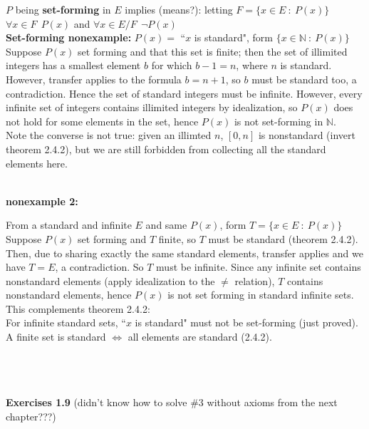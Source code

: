 \documentclass{article}
\newcommand{\hsp}[1][5]{\hspace{0.#1 cm}}
\newcommand{\hcm}[1][1]{\hspace{#1 cm}}
\newcommand{\st}{\ : \ }
\newcommand{\N}{\mathbb{N}}
\begin{document}
\begin{flushleft}
$P$ being \textbf{set-forming} in $E$ implies (means?): letting $F = \{x \in E \st P(x)\}$\\\hcm\hsp $\forall x \in F\ \ P(x)$ and $\forall x \in E/F\ \ \neg P(x)$\\[6pt] 
\textbf{Set-forming nonexample:} $P(x) = $ ``$x$ is standard", form $\{x \in \N \st P(x)\}$\\\hcm
Suppose $P(x)$ set forming and that this set is finite; then the set of illimited integers has a smallest element $b$ for which $b-1 = n$, where $n$ is standard. However, transfer applies to the formula $b = n+1$, so $b$ must be standard too, a contradiction. Hence the set of standard integers must be infinite. However, every infinite set of integers contains illimited integers by idealization, so $P(x)$ does not hold for some elements in the set, hence $P(x)$ is not set-forming in $\N$.\\[6pt]\hcm Note the converse is not true: given an illimted $n$, $[0,n]$ is nonstandard (invert theorem 2.4.2), but we are still forbidden from collecting all the standard elements here.\\\ 

\hypertarget{non2}{\textbf{nonexample 2:}} From a standard and infinite $E$ and same $P(x)$, form $T = \{x \in E \st P(x)\}$\\\hcm Suppose $P(x)$ set forming and $T$ finite, so $T$ must be standard (theorem 2.4.2). Then, due to sharing exactly the same standard elements, transfer applies and we have $T=E$, a contradiction. So $T$ must be infinite. Since any infinite set contains nonstandard elements (apply idealization to the $\neq$ relation), $T$ contains nonstandard elements, hence $P(x)$ is not set forming in standard infinite sets.\\[6pt]\hcm
This complements theorem 2.4.2:\\\hcm
For infinite standard sets, ``$x$ is standard" must not be set-forming (just proved).\\\hcm
A finite set is standard $\iff$ all elements are standard (2.4.2).\\\ \\\ \\\ 



\textbf{Exercises 1.9} (didn't know how to solve \#3 without axioms from the next chapter???)\\\ 


\end{flushleft}
\end{document}
